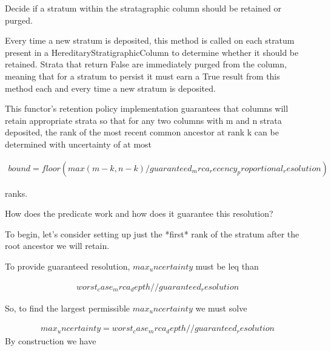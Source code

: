 Decide if a stratum within the stratagraphic column should be
retained or purged.

Every time a new stratum is deposited, this method is called on each
stratum present in a HereditaryStratigraphicColumn to determine whether
it should be retained. Strata that return False are immediately purged
from the column, meaning that for a stratum to persist it must earn a
True result from this method each and every time a new stratum is
deposited.

This functor's retention policy implementation guarantees that columns
will retain appropriate strata so that for any two columns with m and n
strata deposited, the rank of the most recent common ancestor at rank k
can be determined with uncertainty of at most

\begin{align*}
    bound = floor(
        max(m - k, n - k)
        / guaranteed_mrca_recency_proportional_resolution
    )
\end{align*}

ranks.

How does the predicate work and how does it guarantee this resolution?

To begin, let's consider setting up just the *first* rank of the
stratum after the root ancestor we will retain.



To provide guaranteed resolution, $max_uncertainty$ must be leq than

\begin{align*}
   worst_case_mrca_depth // guaranteed_resolution
\end{align*}

So, to find the largest permissible $max_uncertainty$ we must solve

\begin{align*}
   max_uncertainty = worst_case_mrca_depth // guaranteed_resolution
\end{align*}
By construction we have


